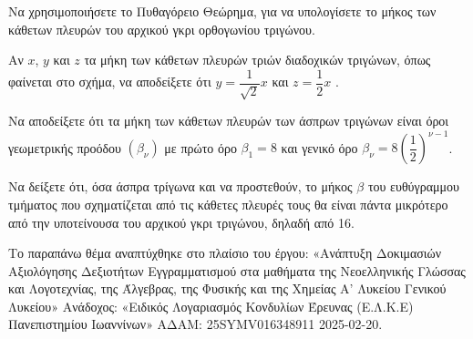 \begin{alist}
\item Να χρησιμοποιήσετε το Πυθαγόρειο Θεώρημα, για να υπολογίσετε το μήκος των κάθετων πλευρών του αρχικού γκρι ορθογωνίου τριγώνου.
\item
\begin{rlist}
\item
  Αν $x$, $y$ και $z$ τα μήκη των κάθετων πλευρών τριών διαδοχικών τριγώνων, όπως φαίνεται στο σχήμα, να αποδείξετε ότι $y = \dfrac{1}{\sqrt{2}}x$ και $z = \dfrac{1}{2}x$ .

\begin{center}
\end{center}

\item
  Να αποδείξετε ότι τα μήκη των κάθετων πλευρών των άσπρων τριγώνων είναι όροι γεωμετρικής προόδου $\left( \beta_{\nu} \right)$ με πρώτο όρο $\beta_{1} = 8$ και γενικό όρο $\beta_{\nu} = 8\left( \dfrac{1}{2} \right)^{\nu - 1}$.
\end{rlist}
\item Να δείξετε ότι, όσα άσπρα τρίγωνα και να προστεθούν, το μήκος $\beta$ του ευθύγραμμου τμήματος που σχηματίζεται από τις κάθετες πλευρές τους θα είναι πάντα μικρότερο από την υποτείνουσα του αρχικού γκρι τριγώνου, δηλαδή από 16.
\end{alist}
{\footnotesize Το παραπάνω θέμα αναπτύχθηκε στο πλαίσιο του έργου: «Ανάπτυξη Δοκιμασιών Αξιολόγησης Δεξιοτήτων Εγγραμματισμού στα μαθήματα της Νεοελληνικής Γλώσσας και Λογοτεχνίας, της Άλγεβρας, της Φυσικής και της Χημείας Α' Λυκείου Γενικού Λυκείου» Ανάδοχος: «Ειδικός Λογαριασμός Κονδυλίων Έρευνας (Ε.Λ.Κ.Ε) Πανεπιστημίου Ιωαννίνων» ΑΔΑΜ: 25SYMV016348911 2025-02-20.}

